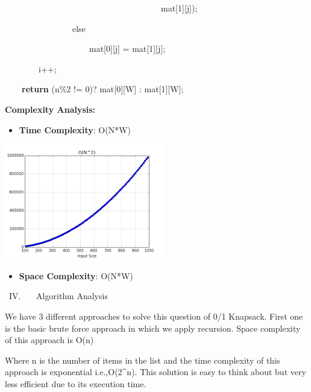 \documentclass[letterpaper]{article}
\newcommand\liststyleWWNumv{%
\renewcommand\labelitemi{\ding{108}}
\renewcommand\labelitemii{{\BigCircle}}
\renewcommand\labelitemiii{\ding{110}}
\renewcommand\labelitemiv{\ding{108}}
}
\begin{document}
\begin{multicols}{2}
\begin{itemize}
{\color[rgb]{0.2509804,0.25882354,0.30588236}
\ \ \ \ \ \ \ \ \ \ \ \ \ \ \ \ \ \ \ \ \ \ \ \ \ \ \ \ \ \ \ \ \ \ \ \ \ mat[1][j]);}

{\color[rgb]{0.2509804,0.25882354,0.30588236}
\ \ \ \ \ \ \ \ \ \ \ \ \ \ \ \ else}

{\color[rgb]{0.2509804,0.25882354,0.30588236}
\ \ \ \ \ \ \ \ \ \ \ \ \ \ \ \ \ \ \ \ mat[0][j] = mat[1][j];}

{\color[rgb]{0.2509804,0.25882354,0.30588236}
\ \ \ \ \ \ \ \ i++;}


\bigskip

\textcolor[rgb]{0.2509804,0.25882354,0.30588236}{\ \ \ \ }\textbf{\textcolor[rgb]{0.2509804,0.25882354,0.30588236}{return}}\textcolor[rgb]{0.2509804,0.25882354,0.30588236}{
(n\%2 != 0)? mat[0][W] : mat[1][W];}


\bigskip
{\bfseries
Complexity Analysis:}


\bigskip

\liststyleWWNumv
\begin{itemize}
\item \textbf{Time Complexity}: O(N*W) 
\end{itemize}

\bigskip
\includegraphics[scale=1.0]{complexity}

\bigskip

\liststyleWWNumv
\begin{itemize}
\item \textbf{Space Complexity}: O(N*W) 
\end{itemize}

\bigskip
{\mdseries
\ IV. \ \ \ Algorithm Analysis}

We have 3 different approaches to solve this question of 0/1 Knapsack. First one is the basic brute force approach in
which we apply recursion. Space complexity of this approach is O(n)

Where n is the number of items in the list and the time complexity of this approach is exponential i.e.,O(2\^{}n). This
solution is easy to think about but very less efficient due to its execution time.



\end{itemize}
\end{multicols}
\end{document}
